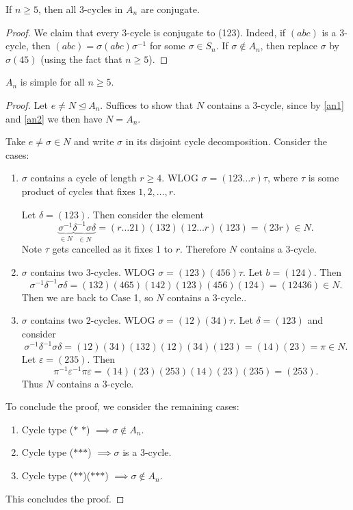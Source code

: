 \documentclass[egregdoesnotlikesansseriftitles,a4paper]{scrartcl}
\begin{document}
\begin{lemma}\label{an2}
     If $n \geq 5$, then all 3-cycles in $A_n$ are conjugate. 
\end{lemma}
\begin{proof}
     We claim that every 3-cycle is conjugate to (123). Indeed, if $(abc)$ is a 3-cycle, then $(abc)=\sigma (abc) {\sigma}^{-1}$ for some $\sigma \in S_n$. If $\sigma \notin A_{n}$, then replace $\sigma$ by $\sigma (45)$ (using the fact that $n \geq 5$).
\end{proof}
\begin{theorem}
      $A_n$ is simple for all $n \geq 5$.
\end{theorem}
\begin{proof}
      Let $e \neq N \unlhd A_{n}$. Suffices to show that $N$ contains a 3-cycle, since by \ref{an1} and \ref{an2} we then have $N=A_n$.

      Take $e \neq \sigma \in N$ and write $\sigma$ in its disjoint cycle decomposition. Consider the cases: 
      \begin{enumerate}
           \item  $\sigma$ contains a cycle of length $r \geq 4$. WLOG $\sigma=(123 \ldots r)\tau$, where $\tau$ is some product of cycles that fixes $1,2, \ldots ,r$. 
           
           Let $\delta =(123)$. Then consider the element \[
           \underbrace{{\sigma}^{-1}}_{\in N} \underbrace{{\delta}^{-1} \sigma \delta}_{\in N} = (r \ldots 21)(132)(12 \ldots r)(123)=(23r) \in N
           .\] Note $\tau$ gets cancelled as it fixes 1 to $r$. Therefore $N$ contains a 3-cycle. 
           \item $\sigma$ contains two 3-cycles. WLOG $\sigma= (123)(456)\tau$. Let $b=(124).$ Then \[
               {\sigma}^{-1} {\delta}^{-1} \sigma \delta = (132)(465)(142)(123)(456)(124)=(12436) \in N
          .\] Then we are back to Case 1, so $N$ contains a 3-cycle..
          \item $\sigma$ contains two 2-cycles. WLOG $\sigma=(12)(34)\tau$. Let $\delta=(123)$ and consider \[
               {\sigma}^{-1} {\delta}^{-1} \sigma \delta = (12)(34)(132)(12)(34)(123)=(14)(23)=\pi \in N
               .\] Let $\varepsilon= (235)$. Then \[
               {\pi}^{-1}{\varepsilon}^{-1}\pi \varepsilon =(14)(23)(253)(14)(23)(235)=(253)
               .\] Thus $N$ contains a 3-cycle.
      \end{enumerate}
      To conclude the proof, we consider the remaining cases:
      \begin{enumerate}
           \item Cycle type ($\ast$ $\ast$) $\implies \sigma \notin A_n$.
           \item Cycle type ($\ast$$\ast$$\ast$) $\implies \sigma$ is a 3-cycle.
           \item Cycle type ($\ast$$\ast$)($\ast$$\ast$$\ast$) $\implies  \sigma \notin A_n$. 
      \end{enumerate}
      This concludes the proof.
\end{proof}
\end{document}
